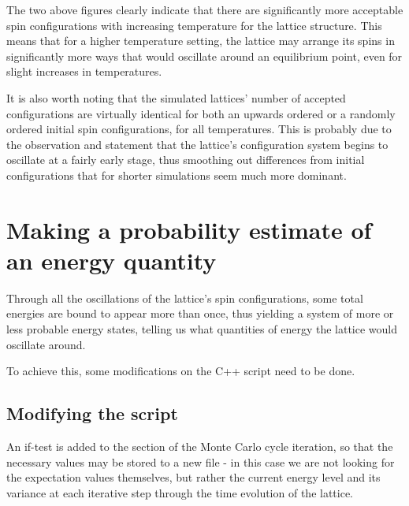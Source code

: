 \documentclass[11pt,a4paper,notitlepage,twocolumn]{article}
\begin{document}
The two above figures clearly indicate that there are significantly more acceptable spin configurations with increasing temperature for the lattice structure. This means that for a higher temperature setting, the lattice may arrange its spins in significantly more ways that would oscillate around an equilibrium point, even for slight increases in temperatures.

It is also worth noting that the simulated lattices' number of accepted configurations are virtually identical for both an upwards ordered or a randomly ordered initial spin configurations, for all temperatures. This is probably due to the observation and statement that the lattice's configuration system begins to oscillate at a fairly early stage, thus smoothing out differences from initial configurations that for shorter simulations seem much more dominant.

\section{Making a probability estimate of an energy quantity}
Through all the oscillations of the lattice's spin configurations, some total energies are bound to appear more than once, thus yielding a system of more or less probable energy states, telling us what quantities of energy the lattice would oscillate around.

To achieve this, some modifications on the C++ script need to be done.

\subsection{Modifying the script}
An if-test is added to the section of the Monte Carlo cycle iteration, so that the necessary values may be stored to a new file - in this case we are not looking for the expectation values themselves, but rather the current energy level and its variance at each iterative step through the time evolution of the lattice.
\end{document}
